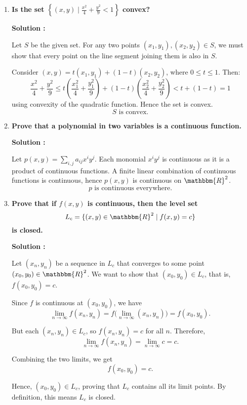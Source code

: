 \documentclass[14pt]{extarticle}
\begin{document}
\begin{enumerate}
\item \textbf{Is the set $\left\{(x, y)\mid \frac{x^2}{4}+\frac{y^2}{9}<1\right\}$ convex?}

\textbf{Solution :}

Let $S$ be the given set. For any two points $(x_1, y_1), (x_2, y_2)\in S$, we must show that every point on the line segment joining them is also in $S$.

Consider $(x,y)=t(x_1,y_1)+(1-t)(x_2,y_2)$, where $0\le t\le1$. Then:
\[\frac{x^2}{4}+\frac{y^2}{9} \le t\left(\frac{x_1^2}{4}+\frac{y_1^2}{9}\right)+(1-t)\left(\frac{x_2^2}{4}+\frac{y_2^2}{9}\right) < t+(1-t)=1\]
using convexity of the quadratic function. Hence the set is convex.
\[\boxed{S\text{ is convex.}}\]

\item \textbf{Prove that a polynomial in two variables is a continuous function.}

\textbf{Solution :}

Let $p(x,y)=\sum_{i,j} a_{ij}x^iy^j$. Each monomial $x^iy^j$ is continuous as it is a product of continuous functions. A finite linear combination of continuous functions is continuous, hence $p(x,y)$ is continuous on $\mathbbm{R}^2$.
\[\boxed{p\text{ is continuous everywhere.}}\]

\newpage

\item \textbf{Prove that if $f(x, y)$ is continuous, then the level set }
\[
L_c = \{(x, y) \in \mathbbm{R}^2 \mid f(x, y) = c\}
\]
\textbf{is closed.}

\textbf{Solution :}

Let $(x_n, y_n)$ be a sequence in $L_c$ that converges to some point $(x_0, y_0) \in \mathbbm{R}^2$. We want to show that $(x_0, y_0) \in L_c$, that is, $f(x_0, y_0) = c$.

Since $f$ is continuous at $(x_0, y_0)$, we have
\[
\lim_{n \to \infty} f(x_n, y_n) = f\big(\lim_{n \to \infty} (x_n, y_n)\big) = f(x_0, y_0).
\]

But each $(x_n, y_n) \in L_c$, so $f(x_n, y_n) = c$ for all $n$. Therefore,
\[
\lim_{n \to \infty} f(x_n, y_n) = \lim_{n \to \infty} c = c.
\]

Combining the two limits, we get
\[
f(x_0, y_0) = c.
\]

Hence, $(x_0, y_0) \in L_c$, proving that $L_c$ contains all its limit points. By definition, this means $L_c$ is closed.


\end{enumerate}
\end{document}
